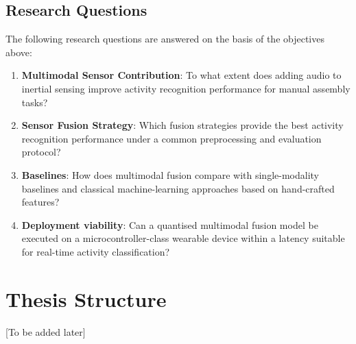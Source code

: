 \subsection{Research Questions}
The following research questions are answered on the basis of the objectives above:
\begin{enumerate}
    \item \textbf{Multimodal Sensor Contribution}: To what extent does adding audio to inertial sensing improve activity recognition performance for manual assembly tasks?
    \item \textbf{Sensor Fusion Strategy}: Which fusion strategies provide the best activity recognition performance under a common preprocessing and evaluation protocol?
    \item \textbf{Baselines}: How does multimodal fusion compare with single-modality baselines and classical machine-learning approaches based on hand-crafted features?
    \item \textbf{Deployment viability}: Can a quantised multimodal fusion model be executed on a microcontroller-class wearable device within a latency suitable for real-time activity classification?
\end{enumerate}

\section{Thesis Structure}

[To be added later]